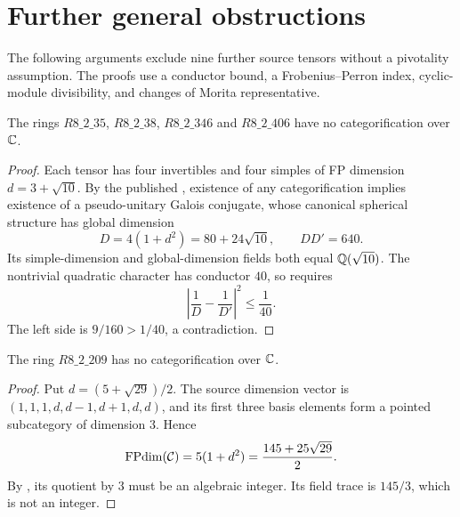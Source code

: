 \section{Further general obstructions}
\label{sec:theoretical-oct16}
The following arguments exclude nine further source tensors without a
pivotality assumption. The proofs use a conductor bound, a
Frobenius--Perron index, cyclic-module divisibility, and changes of Morita representative.

\begin{proposition}\label{prop:r8-conductor-four}
The rings $R8\_2\_35$, $R8\_2\_38$, $R8\_2\_346$ and
$R8\_2\_406$ have no categorification over $\mathbb C$.
\end{proposition}
\begin{proof}
Each tensor has four invertibles and four simples of FP dimension
$d=3+\sqrt{10}$. By the published \cite[Lemma~3.1]{SchNear}, existence
of any categorification implies existence of a pseudo-unitary Galois
conjugate, whose canonical spherical structure has global dimension
\[
 D=4(1+d^2)=80+24\sqrt{10},\qquad DD'=640.
\]
Its simple-dimension and global-dimension fields both equal
$\mathbb Q(\sqrt{10})$. The nontrivial quadratic character has conductor $40$,
so \cite[Theorem~5.1]{SchDimensionBlock} requires
\[
 \left|\frac1D-\frac1{D'}\right|^2\leq\frac1{40}.
\]
The left side is $9/160>1/40$, a contradiction.
\end{proof}

\begin{proposition}\label{prop:r8-209-index}
The ring $R8\_2\_209$ has no categorification over $\mathbb C$.
\end{proposition}
\begin{proof}
Put $d=(5+\sqrt{29})/2$. The source dimension vector is
$(1,1,1,d,d-1,d+1,d,d)$, and its first three basis elements form a
pointed subcategory of dimension $3$. Hence
\[
 \operatorname{FPdim}(\mathcal C)=5(1+d^2)=\frac{145+25\sqrt{29}}2.
\]
By \cite[Proposition~8.15]{ENO}, its quotient by $3$ must be an
algebraic integer. Its field trace is $145/3$, which is not an integer.
\end{proof}

